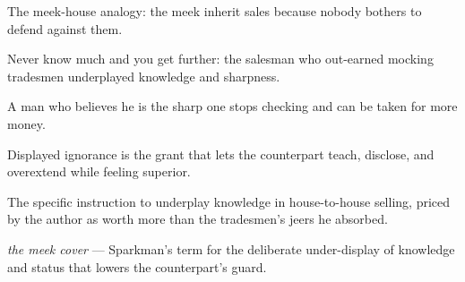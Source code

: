 

\begin{distilled}
  \item The meek-house analogy: the meek inherit sales because nobody bothers to defend against them.
  \item Never know much and you get further: the salesman who out-earned mocking tradesmen underplayed knowledge and sharpness.
  \item A man who believes he is the sharp one stops checking and can be taken for more money.
  \item Displayed ignorance is the grant that lets the counterpart teach, disclose, and overextend while feeling superior.
\end{distilled}
\begin{unique}
  \item The specific instruction to underplay knowledge in house-to-house selling, priced by the author as worth more than the tradesmen's jeers he absorbed.
\end{unique}
\begin{terms}
  \item \emph{the meek cover} --- Sparkman's term for the deliberate under-display of knowledge and status that lowers the counterpart's guard.
\end{terms}
